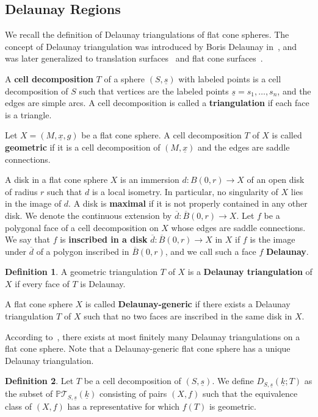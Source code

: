 \documentclass{compositio}
\numberwithin{equation}{section}
\numberwithin{figure}{section}
\theoremstyle{definition}
\newtheorem{definition}{Definition}[section]
\theoremstyle{plain}
\begin{document}
{\subsection{Delaunay Regions}\label{sec:delaunay}
We recall the definition of Delaunay triangulations of flat cone spheres. The concept of Delaunay triangulation was introduced by Boris Delaunay in~\cite{Delaunay}, and was later generalized to translation surfaces~\cite{Masur1991} and flat cone surfaces~\cite{thu}.

A \textbf{cell decomposition} $T$ of a sphere $(S, \underline{s})$ with labeled points is a cell decomposition of $S$ such that vertices are the labeled points $\underline{s} = s_1, \ldots, s_n$, and the edges are simple arcs. A cell decomposition is called a \textbf{triangulation} if each face is a triangle.

Let $X=(M,\underline{x},g)$ be a flat cone sphere. A cell decomposition $T$ of $X$ is called \textbf{geometric} if it is a cell decomposition of $(M, \underline{x})$ and the edges are saddle connections.

A disk in a flat cone sphere $X$ is an immersion $d: B(0,r)\to X$ of an open disk of radius $r$ such that $d$ is a local isometry. In particular, no singularity of $X$ lies in the image of $d$. A disk is \textbf{maximal} if it is not properly contained in any other disk. We denote the continuous extension by $\overline{d}:\overline{B}(0,r)\to X$. Let $f$ be a polygonal face of a cell decomposition on $X$ whose edges are saddle connections. We say that $f$ is \textbf{inscribed in a disk} $\overline{d}:\overline{B}(0, r)\to X$ in $X$ if $f$ is the image under $\overline{d}$ of a polygon inscribed in $\overline{B}(0, r)$, and we call such a face $f$ \textbf{Delaunay}.

\begin{definition}\label{def:delaunay}
    A geometric triangulation $T$ of $X$ is a \textbf{Delaunay triangulation} of $X$ if every face of $T$ is Delaunay.

    A flat cone sphere $X$ is called \textbf{Delaunay-generic} if there exists a Delaunay triangulation $T$ of $X$ such that no two faces are inscribed in the same disk in $X$.
\end{definition}
According to~\cite{thu}, there exists at most finitely many Delaunay triangulations on a flat cone sphere. Note that a Delaunay-generic flat cone sphere has a unique Delaunay triangulation.

\begin{definition}
    Let $T$ be a cell decomposition of $(S, \underline{s})$. We define $D_{S,\underline{s}}(\underline{k};T)$ as the subset of $\mathbb{P}\mathcal{T}_{S, \underline{s}}(\underline{k})$ consisting of pairs $(X,f)$ such that the equivalence class of $(X,f)$ has a representative for which $f(T)$ is geometric.


\end{definition}}
\end{document}
